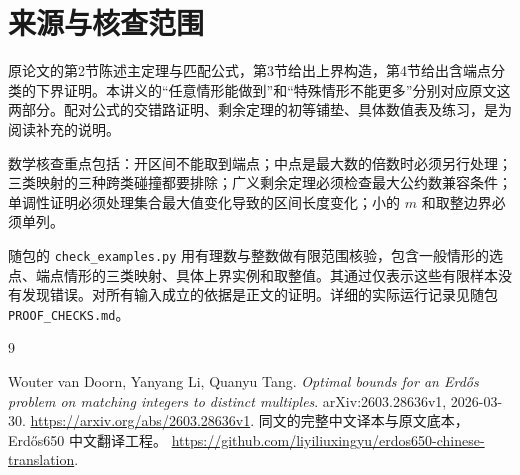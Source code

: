 \documentclass[UTF8,a4paper,oneside,openany,fontset=fandol,zihao=-4]{ctexbook}
\theoremstyle{guide}
\begin{document}
\backmatter
\chapter{来源与核查范围}
原论文的第2节陈述主定理与匹配公式，第3节给出上界构造，第4节给出含端点分类的下界证明。本讲义的“任意情形能做到”和“特殊情形不能更多”分别对应原文这两部分。配对公式的交错路证明、剩余定理的初等铺垫、具体数值表及练习，是为阅读补充的说明。

数学核查重点包括：开区间不能取到端点；中点是最大数的倍数时必须另行处理；三类映射的三种跨类碰撞都要排除；广义剩余定理必须检查最大公约数兼容条件；单调性证明必须处理集合最大值变化导致的区间长度变化；小的 $m$ 和取整边界必须单列。

随包的 \texttt{check\_examples.py} 用有理数与整数做有限范围核验，包含一般情形的选点、端点情形的三类映射、具体上界实例和取整值。其通过仅表示这些有限样本没有发现错误。对所有输入成立的依据是正文的证明。详细的实际运行记录见随包 \texttt{PROOF\_CHECKS.md}。

\begin{thebibliography}{9}
 Wouter van Doorn, Yanyang Li, Quanyu Tang.
\emph{Optimal bounds for an Erd\H{o}s problem on matching integers to distinct multiples}.
arXiv:2603.28636v1, 2026-03-30.
\url{https://arxiv.org/abs/2603.28636v1}.
 同文的完整中文译本与原文底本，Erd\H{o}s650 中文翻译工程。
\url{https://github.com/liyiliuxingyu/erdos650-chinese-translation}.
\end{thebibliography}
\end{document}
